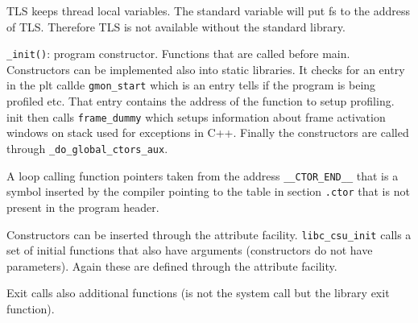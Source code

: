 \documentclass[twoside]{article}
\begin{document}
TLS keeps thread local variables. The standard variable will put fs to the
address of TLS. Therefore TLS is not available without the standard library.

\texttt{_init()}: program constructor. Functions that are called before main.
Constructors can be implemented also into static libraries. It checks for an
entry in the plt callde \texttt{gmon_start} which is an entry tells if the
program is being profiled etc. That entry contains the address of the function
to setup profiling. init then calls \texttt{frame_dummy} which setups
information about frame activation windows on stack used for exceptions in C++.
Finally the constructors are called through \texttt{_do_global_ctors_aux}.

A loop calling function pointers taken from the address \texttt{__CTOR_END__}
that is a symbol inserted by the compiler pointing to the table in section
\texttt{.ctor} that is not present in the program header.

Constructors can be inserted through the attribute facility.
\texttt{libc_csu_init} calls a set of initial functions that also have arguments
(constructors do not have parameters). Again these are defined through the
attribute facility.

Exit calls also additional functions (is not the system call but the library exit
function).

\newpage


\end{document}
